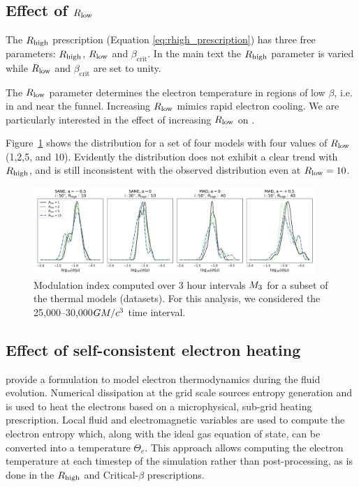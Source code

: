 \subsection{Effect of \texorpdfstring{$R_\mathrm{low}$}{Rlow}}

The $R_\mathrm{high}$ prescription (Equation \ref{eq:rhigh_prescription}) has three free parameters: $R_\mathrm{high}$, $R_\mathrm{low}$ and $\beta_\mathrm{crit}$.
In the main text the $R_\mathrm{high}$ parameter is varied while $R_\mathrm{low}$ and $\beta_\mathrm{crit}$ are set to unity.

The $R_\mathrm{low}$ parameter determines the electron temperature in regions of low $\beta$, i.e. in and near the funnel.
Increasing $R_\mathrm{low}$ mimics rapid electron cooling.
We are particularly interested in the effect of increasing $R_\mathrm{low}$ on .

Figure~\ref{fig:mi_rlow} shows the  distribution for a set of four \kharma models with four values of $R_\mathrm{low}$ (1,2,5, and 10).
Evidently the  distribution does not exhibit a clear trend with $R_\mathrm{high}$, and is still inconsistent with the observed distribution even at $R_\mathrm{low} = 10$.

\begin{figure}
  \centering
  \includegraphics[width=0.95\textwidth]{figures/mi_rlow_select_models.png}
  \caption{Modulation index computed over 3 hour intervals $M_{3}$ for a subset of the thermal models (\kharma datasets).
For this analysis, we considered the 25,000--30,000$GM/c^3$ time interval.}
  \label{fig:mi_rlow}
\end{figure}

\subsection{Effect of self-consistent electron heating}

\citealt{2015MNRAS.454.1848R} provide a formulation to model electron thermodynamics during the fluid evolution.
Numerical dissipation at the grid scale sources entropy generation and is used to heat the electrons based on a microphysical, sub-grid heating prescription.
Local fluid and electromagnetic variables are used to compute the electron entropy which, along with the ideal gas equation of state, can be converted into a temperature $\Theta_{e}$.
This approach allows computing the electron temperature at each timestep of the simulation rather than post-processing, as is done in the $R_\mathrm{high}$ and Critical-$\beta$ prescriptions.

